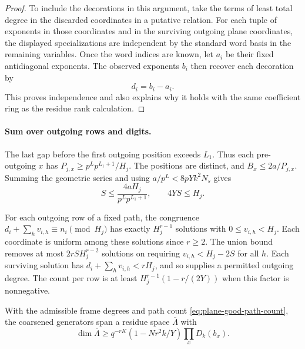 \begin{proof}
To include the decorations in this argument, take the terms of
least total degree in the discarded coordinates in a putative
relation. For each tuple of exponents in those coordinates and
in the surviving outgoing plane coordinates, the displayed
specializations are independent by the standard word basis
in the remaining variables. Once the word indices are known, let \(a_i\) be their fixed antidiagonal exponents. The observed exponents \(b_i\) then recover each decoration by
\[
 d_i=b_i-a_i.
\]
This proves
independence and also explains why it holds with the same
coefficient ring as the residue rank calculation.

\end{proof}



\paragraph{Sum over outgoing rows and digits.}
The last gap before the first outgoing position exceeds \(L_1\).
Thus each pre-outgoing \(x\) has
\(P_{j,x}\ge p^L p^{L_1+1}/H_j\). The positions are distinct, and
\(B_x\le 2a/P_{j,x}\). Summing the geometric series and using
\(a/p^L<8pYk^2N_s\) gives
\[
 S\le \frac{4aH_j}{p^L p^{L_1+1}},\qquad
 4YS\le H_j .
\]

For each outgoing row of a fixed path, the congruence
\(d_i+\sum_h v_{i,h}\equiv n_i\pmod{H_j}\) has exactly
\(H_j^{r-1}\) solutions with \(0\le v_{i,h}<H_j\). Each coordinate
is uniform among these solutions since \(r\ge2\). The union
bound removes at most \(2rS H_j^{r-2}\) solutions on requiring
\(v_{i,h}<H_j-2S\) for all \(h\). Each surviving solution has
\(d_i+\sum_h v_{i,h}<rH_j\), and so supplies a permitted outgoing
degree. The count per row is at least
\(H_j^{r-1}(1-r/(2Y))\) when this factor is nonnegative.

\begin{proposition}\label{prop:coarse-plane-rank}
With the admissible frame degrees and path count
\eqref{eq:plane-good-path-count}, the coarsened generators
span a residue space \(\overline\Lambda\) with
\[
 \dim\overline\Lambda\ge q^{-rK}(1-Nr^2 k/Y)\prod_xD_k(b_x).
\]

\end{proposition}

